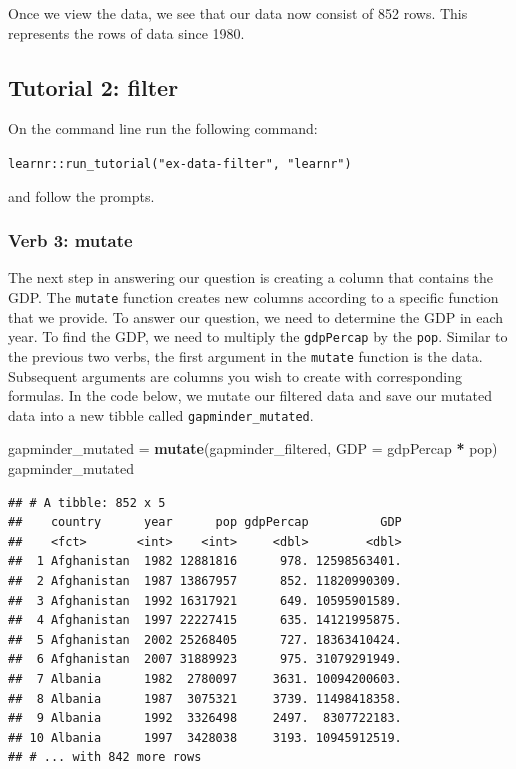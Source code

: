 \documentclass[]{book}
\newenvironment{Shaded}{\begin{snugshade}}{\end{snugshade}}
\newcommand{\DataTypeTok}[1]{\textcolor[rgb]{0.13,0.29,0.53}{#1}}
\newcommand{\KeywordTok}[1]{\textcolor[rgb]{0.13,0.29,0.53}{\textbf{#1}}}
\newcommand{\NormalTok}[1]{#1}
\newcommand{\OperatorTok}[1]{\textcolor[rgb]{0.81,0.36,0.00}{\textbf{#1}}}
\newcommand{\StringTok}[1]{\textcolor[rgb]{0.31,0.60,0.02}{#1}}
\begin{document}
Once we view the data, we see that our data now consist of 852 rows. This represents the rows of data since 1980.

\hypertarget{tutorial-2-filter}{%
\subsection{Tutorial 2: filter}\label{tutorial-2-filter}}

On the command line run the following command:

\texttt{learnr::run\_tutorial("ex-data-filter",\ "learnr")}

and follow the prompts.

\hypertarget{verb-3-mutate}{%
\subsubsection{Verb 3: mutate}\label{verb-3-mutate}}

The next step in answering our question is creating a column that contains the GDP. The \texttt{mutate} function creates new columns according to a specific function that we provide. To answer our question, we need to determine the GDP in each year. To find the GDP, we need to multiply the \texttt{gdpPercap} by the \texttt{pop}. Similar to the previous two verbs, the first argument in the \texttt{mutate} function is the data. Subsequent arguments are columns you wish to create with corresponding formulas. In the code below, we mutate our filtered data and save our mutated data into a new tibble called \texttt{gapminder\_mutated}.

\begin{Shaded}
\begin{Highlighting}[]
\NormalTok{gapminder_mutated =}\StringTok{ }\KeywordTok{mutate}\NormalTok{(gapminder_filtered, }\DataTypeTok{GDP =}\NormalTok{ gdpPercap }\OperatorTok{*}\StringTok{ }\NormalTok{pop)}
\NormalTok{gapminder_mutated}
\end{Highlighting}
\end{Shaded}

\begin{verbatim}
## # A tibble: 852 x 5
##    country      year      pop gdpPercap          GDP
##    <fct>       <int>    <int>     <dbl>        <dbl>
##  1 Afghanistan  1982 12881816      978. 12598563401.
##  2 Afghanistan  1987 13867957      852. 11820990309.
##  3 Afghanistan  1992 16317921      649. 10595901589.
##  4 Afghanistan  1997 22227415      635. 14121995875.
##  5 Afghanistan  2002 25268405      727. 18363410424.
##  6 Afghanistan  2007 31889923      975. 31079291949.
##  7 Albania      1982  2780097     3631. 10094200603.
##  8 Albania      1987  3075321     3739. 11498418358.
##  9 Albania      1992  3326498     2497.  8307722183.
## 10 Albania      1997  3428038     3193. 10945912519.
## # ... with 842 more rows
\end{verbatim}
\end{document}
